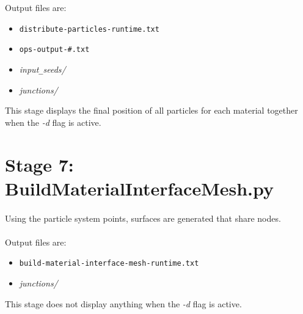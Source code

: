 \documentclass[fleqn,12pt,openany]{book}
\begin{document}
Output files are:
\begin{itemize}

\item{\verb+distribute-particles-runtime.txt+}
\item{\verb+ops-output-#.txt+}
\item{\emph{input}\verb+_+\emph{seeds/}}
\item{\emph{junctions/}}

\end{itemize}

This stage displays the final position of all particles for each material 
together when the \emph{-d} flag is active.

\section{Stage 7: BuildMaterialInterfaceMesh.py}

\paragraph{}
Using the particle system points, surfaces are generated that share nodes. \\ \\

Output files are:
\begin{itemize}

\item{\verb+build-material-interface-mesh-runtime.txt+}
\item{\emph{junctions/}}

\end{itemize}

This stage does not display anything when the \emph{-d} flag is active.
\end{document}
